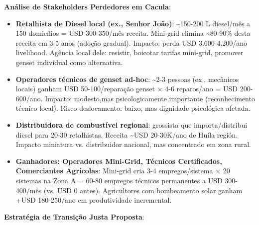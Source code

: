 \documentclass[12pt, a4paper]{article}
\begin{document}
\textbf{Análise de Stakeholders Perdedores em Cacula}:
\begin{itemize}
\item \textbf{Retalhista de Diesel local (ex., Senhor João)}: \textasciitilde{}150-200 L diesel/mês a 150 domicílios = USD 300-350/mês receita. Mini-grid elimina \textasciitilde{}80-90\% desta receita em 3-5 anos (adoção gradual). Impacto: perda USD 3.600-4.200/ano livelihood. Agência local dele: resistir, boicotar tarifas mini-grid, promover genset individual como alternativa.

\item \textbf{Operadores técnicos de genset ad-hoc}: \textasciitilde{}2-3 pessoas (ex., mecânicos locais) ganham USD 50-100/reparação genset × 4-6 reparos/ano = USD 200-600/ano. Impacto: modesto,mas psicologicamente importante (reconhecimento técnico local). Risco deslocamento: baixo, mas dignidade psicológica afetada.

\item \textbf{Distribuidora de combustível regional}: grossista que importa/distribui diesel para 20-30 retalhistas. Receita \textasciitilde{}USD 20-30K/ano de Huíla región. Impacto miniatura vs. distribuidor nacional, mas concentrado em zona rural.

\item \textbf{Ganhadores: Operadores Mini-Grid, Técnicos Certificados, Comerciantes Agrícolas}: Mini-grid cria 3-4 empregos/sistema × 20 sistemas na Zona A = 60-80 empregos técnicos permanentes a USD 300-400/mês (vs. USD 0 antes). Agricultores com bombeamento solar ganham +USD 180-250/ano em produtividade incremental.
\end{itemize}

\textbf{Estratégia de Transição Justa Proposta}:
\end{document}
